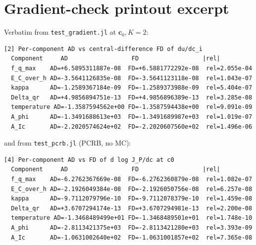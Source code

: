 \documentclass[11pt,a4paper]{article}
\begin{document}
\section{Gradient-check printout excerpt}
\label{app:grad}
Verbatim from \texttt{test\_gradient.jl} at $\bm c_0, K=2$:
\begin{verbatim}
[2] Per-component AD vs central-difference FD of du/dc_i
  Component     AD                  FD                  |rel|
  f_q_max    AD=+6.5895311887e-08  FD=+6.5881772292e-08  rel=2.055e-04
  E_C_over_h AD=-3.5641126835e-08  FD=-3.5641123118e-08  rel=1.043e-07
  kappa      AD=-1.2589367184e-09  FD=-1.2589373988e-09  rel=5.404e-07
  Delta_qr   AD=+4.9856894751e-13  FD=+4.9856896389e-13  rel=3.285e-08
  temperature AD=-1.3587594562e+00 FD=-1.3587594438e+00  rel=9.091e-09
  A_phi      AD=-1.3491688613e+03  FD=-1.3491689987e+03  rel=1.019e-07
  A_Ic       AD=-2.2020574624e+02  FD=-2.2020607560e+02  rel=1.496e-06
\end{verbatim}
and from \texttt{test\_pcrb.jl} (PCRB, no MC):
\begin{verbatim}
[4] Per-component AD vs FD of d log J_P/dc at c0
  Component     AD                  FD                  |rel|
  f_q_max    AD=-6.2762367669e-08  FD=-6.2762360879e-08  rel=1.082e-07
  E_C_over_h AD=-2.1926049384e-08  FD=-2.1926050756e-08  rel=6.257e-08
  kappa      AD=-9.7112079796e-10  FD=-9.7112078379e-10  rel=1.459e-08
  Delta_qr   AD=+3.6707294174e-13  FD=+3.6707294981e-13  rel=2.200e-08
  temperature AD=-1.3468489499e+01 FD=-1.3468489501e+01  rel=1.748e-10
  A_phi      AD=-2.8113421375e+03  FD=-2.8113421280e+03  rel=3.393e-09
  A_Ic       AD=-1.0631002640e+02  FD=-1.0631001857e+02  rel=7.365e-08
\end{verbatim}
\end{document}
